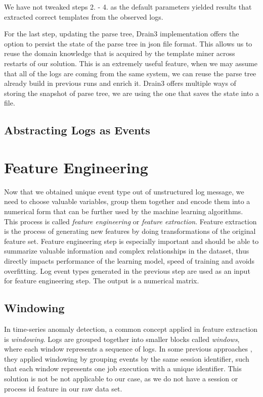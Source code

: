 We have not tweaked steps 2. - 4. as the default parameters \cite{ibmdrain3} yielded results that extracted correct templates from the observed logs.

For the last step, updating the parse tree, Drain3 implementation offers the option to persist the state of the parse tree in json file format. This allows us to reuse the  domain knowledge that is acquired by the template miner across restarts of our solution.
This is an extremely useful feature, when we may assume that all of the logs are coming from the same system, we can reuse the parse tree already build in previous runs and enrich it.
Drain3 offers multiple ways of storing the snapshot of parse tree, we are using the one that saves the state into a file.

\subsection{Abstracting Logs as Events}


\section{Feature Engineering}
\label{section:featureEngineering}
Now that we obtained unique event type out of unstructured log message, we need to choose valuable variables, group them together and encode them into a numerical form that can be further used by the machine learning algorithms.  This process is called \textit{feature engineering} or \textit{feature extraction}. Feature extraction is the process of generating new features by doing transformations of the original feature set.  
Feature engineering step is especially important and should be able to summarize valuable information and complex relationships in the dataset, thus directly impacts performance of the learning model, speed of training and avoids overfitting. Log event types generated in the previous step are used as an input for feature engineering step. The output is a numerical matrix. 

\subsection{Windowing}

In time-series anomaly detection, a common concept applied in feature extraction is \textit{windowing}. 
Logs are grouped together into smaller blocks called \textit{windows}, where each window represents a sequence of logs. In some previous approaches \cite{xu2009}, they applied windowing by grouping events by the same session identifier, such that each window represents one job execution with a unique identifier. This solution is not be not applicable to our case, as we do not have a session or process id feature in our raw data set.

